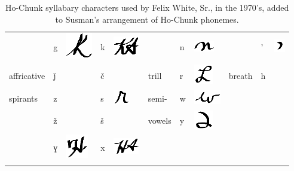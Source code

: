 \documentclass[output=paper]{LSP/langsci}
\begin{document}
\begin{table}
\begin{tabular}{lllllllllll}
& g & \includegraphics{figures/Danker6g} & k & \includegraphics{figures/Danker6k} && n & \includegraphics{figures/Danker6n} && ' & \includegraphics{figures/Danker6glottal}\\
affricative & ǰ && č && trill & r & \includegraphics{figures/Danker6r} & breath & h\\
spirants & z && s & \includegraphics{figures/Danker6s} & semi- & w & \includegraphics{figures/Danker6w}\\
& ž && š && vowels & y & \includegraphics{figures/Danker6y}\\
& ɣ & \includegraphics{figures/Danker6gh} & x & \includegraphics{figures/Danker6x}\\
\lspbottomrule
\end{tabular}
\caption{Ho-Chunk syllabary characters used by Felix White, Sr., in the 1970's, added to Susman's \citeyearpar[15]{Susman1943} arrangement of Ho-Chunk phonemes.}
\label{whitesyllabary}
\end{table}
\end{document}
